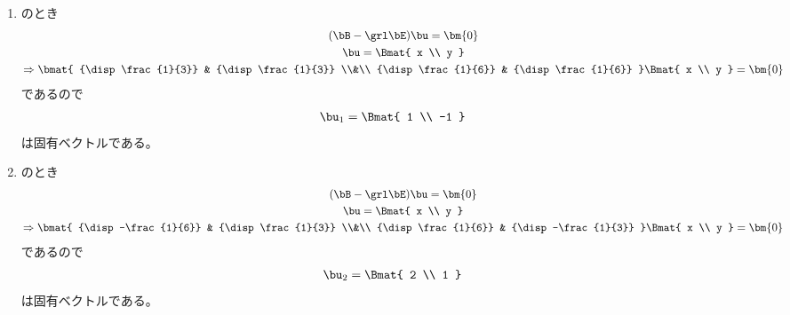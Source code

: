 \begin{ans*}
\begin{enumerate}[label=(\arabic*)]
    \begin{enumerate}[label=(\roman*)]
      \item {}のとき
      \begin{gather}
        (\bB -\grl\bE)\bu = \bm{0} \\
        \bu = \Bmat{ x \\ y } \\
        \Rightarrow
        \bmat{
          {\disp\frac{1}{3}} & {\disp\frac{1}{3}} \\&\\ {\disp\frac{1}{6}} & {\disp\frac{1}{6}}
        }
        \Bmat{
          x \\ y
        }
        =\bm{0}
      \end{gather}
      であるので
      \begin{gather}
        \bu_{1} =
        \Bmat{
          1 \\ -1
        }
      \end{gather}
      は固有ベクトルである。
      \item {}のとき
      \begin{gather}
        (\bB -\grl\bE)\bu = \bm{0} \\
        \bu = \Bmat{ x \\ y } \\
        \Rightarrow
        \bmat{
          {\disp -\frac{1}{6}} & {\disp\frac{1}{3}} \\&\\ {\disp\frac{1}{6}} & {\disp -\frac{1}{3}}
        }
        \Bmat{
          x \\ y
        }
        =\bm{0}
      \end{gather}
      であるので
      \begin{gather}
        \bu_{2} =
        \Bmat{
          2 \\ 1
        }
      \end{gather}
      は固有ベクトルである。
    \end{enumerate}


\end{enumerate}
\end{ans*}
